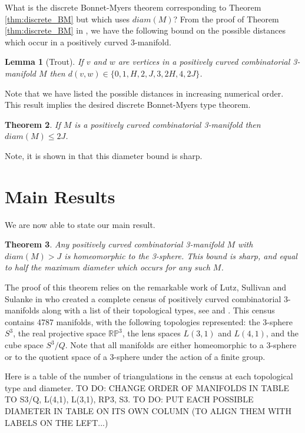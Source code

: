 \documentclass[12pt]{article}
\newtheorem{thm}{Theorem}[section]
\newtheorem{lem}[thm]{Lemma}
\begin{document}
What is the discrete Bonnet-Myers theorem corresponding to Theorem \ref{thm:discrete_BM} but which uses $diam(M)$? From the proof of Theorem \ref{thm:discrete_BM} in \cite{Trout10}, we have the following bound on the possible distances which occur in a positively curved 3-manifold.

\begin{lem}[Trout] If $v$ and $w$ are vertices in a positively curved combinatorial 3-manifold $M$ then $d(v,w) \in \{0, 1, H, 2, J, 3, 2H, 4, 2J \}$.
\end{lem}

\noindent Note that we have listed the possible distances in increasing numerical order. This result implies the desired discrete Bonnet-Myers type theorem.

\begin{thm} If $M$ is a positively curved combinatorial 3-manifold then $diam(M) \leq 2J$.
\label{thm:discrete_BM_expanded_paths}
\end{thm}

\noindent Note, it is shown in \cite{Trout10} that this diameter bound is sharp.

\section{Main Results}

We are now able to state our main result.

\begin{thm} Any positively curved combinatorial 3-manifold $M$ with $diam(M)>J$ is homeomorphic to the 3-sphere. This bound is sharp, and equal to half the maximum diameter which occurs for any such $M$.
\label{thm:discrete_GS}
\end{thm}

\noindent The proof of this theorem relies on the remarkable work of Lutz, Sullivan and Sulanke in \cite{Lutz07, LutzSul_unpub, sulanke2009isomorphism} who created a complete census of positively curved combinatorial 3-manifolds along with a list of their topological types, see \cite{Lutz_online_manifolds} and \cite{Lutz_online_topological_types}. This census contains 4787 manifolds, with the following topologies represented: the 3-sphere $S^3$, the real projective space $\mathbb{RP}^3$, the lens spaces $L(3,1)$ and $L(4,1)$, and the cube space $S^3/Q$. Note that all manifolds are either homeomorphic to a 3-sphere or to the quotient space of a 3-sphere under the action of a finite group. 

Here is a table of the number of triangulations in the census at each topological type and diameter. TO DO: CHANGE ORDER OF MANIFOLDS IN TABLE TO S3/Q, L(4,1), L(3,1), RP3, S3. TO DO: PUT EACH POSSIBLE DIAMETER IN TABLE ON ITS OWN COLUMN (TO ALIGN THEM WITH LABELS ON THE LEFT...) \vspace{.1in}
\end{document}
